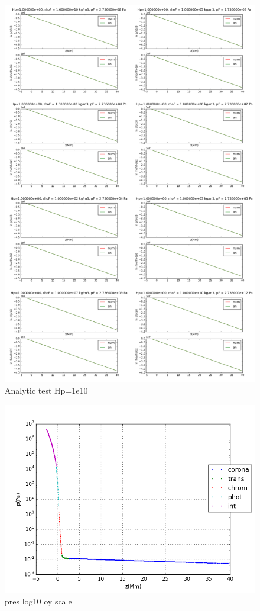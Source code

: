 \documentclass[10pt]{book}
\begin{document}
\begin{figure}[H]
 \centering
 \includegraphics[scale=0.5]{allanalytic2.png}
 \caption{Analytic test Hp=1e10}
\end{figure}


\begin{figure}[H]
 \centering
 \includegraphics[scale=0.5]{fromFileLogScale1.png}
 \caption{pres log10 oy scale}
\end{figure}
\end{document}
